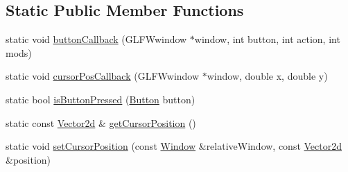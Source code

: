 \subsection*{Static Public Member Functions}
\begin{DoxyCompactItemize}
\item 
static void \hyperlink{classburn_1_1_mouse_a8adf102746fada004ca667879aee8707}{button\-Callback} (G\-L\-F\-Wwindow $\ast$window, int button, int action, int mods)
\item 
static void \hyperlink{classburn_1_1_mouse_af307ec2d582f9312f31677c9b9b8d016}{cursor\-Pos\-Callback} (G\-L\-F\-Wwindow $\ast$window, double x, double y)
\item 
static bool \hyperlink{classburn_1_1_mouse_ab6fe488e7850b0250f1305c7285ab772}{is\-Button\-Pressed} (\hyperlink{classburn_1_1_mouse_ade100e00a955fdf0a15a611fac396094}{Button} button)
\item 
static const \hyperlink{namespaceburn_a8ae93c5e897bdb83b7df8536308fb0e0}{Vector2d} \& \hyperlink{classburn_1_1_mouse_a50f02208d519d7fd50adedb28b9ed558}{get\-Cursor\-Position} ()
\item 
static void \hyperlink{classburn_1_1_mouse_af41c7c694820b08ef663f2329762b333}{set\-Cursor\-Position} (const \hyperlink{classburn_1_1_window}{Window} \&relative\-Window, const \hyperlink{namespaceburn_a8ae93c5e897bdb83b7df8536308fb0e0}{Vector2d} \&position)
\end{DoxyCompactItemize}


